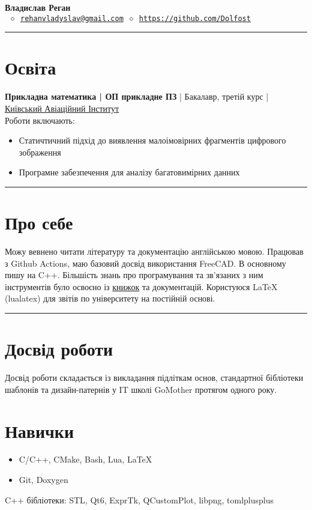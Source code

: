 


\newcommand{\crule}{\par\noindent\rule{\textwidth}{0.5pt}}


\thispagestyle{empty}

\begin{center}
	\LARGE \textbf{Владислав Реган}\\[4mm] \normalsize
	\texttt{ \(\diamond\)\
	\href{mailto:rehanvladyslav@gmail.com}{rehanvladyslav@gmail.com} \(\diamond\)
	\url{https://github.com/Dolfost}}
\end{center}
\crule
\section{Освіта}
\textbf{Прикладна математика | ОП прикладне ПЗ} | Бакалавр, третій курс | \href{http://nau.edu.ua/en/}{Київський Авіаційний Інститут}\\
Роботи включають:
\begin{itemize}
	\item Статичтичний підхід до виявлення малоімовірних фрагментів цифрового зображення
	\item Програмне забезпечення для аналізу багатовимірних данних
\end{itemize}

\crule
\section{Про себе}
Можу вевнено читати літературу та документацію англійською мовою. Працював з
Github Actions, маю базовий досвід використання FreeCAD. В основному пишу на
C++. Більшість знань про програмування та зв'язаних з ним інструментів було
освоєно із
\href{https://github.com/Dolfost/Dolfost/blob/main/README.md#literature--sources}{книжок}
та документацій. Користуюся LaTeX (lualatex) для звітів по університету на
постійній основі.

\crule
\section{Досвід роботи}
Досвід роботи складається із викладання підліткам основ, стандартної бібліотеки
шаблонів та дизайн-патернів у IT школі GoMother протягом одного року.

\section{Навички}
\begin{itemize}
	\item C/C++, CMake, Bash, Lua, LaTeX
	\item Git, Doxygen
\end{itemize}
C++ бібліотеки: STL, Qt6, ExprTk, QCustomPlot, libpng, tomlplusplus


